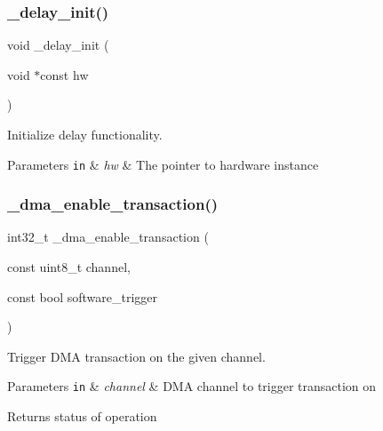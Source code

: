\subsubsection{\texorpdfstring{\+\_\+delay\+\_\+init()}{\_delay\_init()}}
{\footnotesize\ttfamily void \+\_\+delay\+\_\+init (\begin{DoxyParamCaption}\item[{void $\ast$const}]{hw }\end{DoxyParamCaption})}



Initialize delay functionality. 


\begin{DoxyParams}[1]{Parameters}
\mbox{\tt in}  & {\em hw} & The pointer to hardware instance \\
\hline
\end{DoxyParams}
\mbox{\label{group___h_p_l_ga274dfd4667fa2dedb9d550b4f92189d8}} 
\subsubsection{\texorpdfstring{\+\_\+dma\+\_\+enable\+\_\+transaction()}{\_dma\_enable\_transaction()}}
{\footnotesize\ttfamily int32\+\_\+t \+\_\+dma\+\_\+enable\+\_\+transaction (\begin{DoxyParamCaption}\item[{const uint8\+\_\+t}]{channel,  }\item[{const bool}]{software\+\_\+trigger }\end{DoxyParamCaption})}



Trigger D\+MA transaction on the given channel. 


\begin{DoxyParams}[1]{Parameters}
\mbox{\tt in}  & {\em channel} & D\+MA channel to trigger transaction on\\
\hline
\end{DoxyParams}
\begin{DoxyReturn}{Returns}
status of operation 
\end{DoxyReturn}
\mbox{\label{group___h_p_l_ga651aecc566b4d05e988791c85e2efa99}} 
